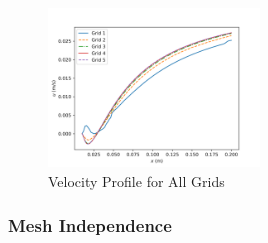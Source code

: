 \begin{figure}[H]
    \centering
    \includegraphics[width=0.5\textwidth]{Questions/Figures/recirc_combined.png}
    \caption{Velocity Profile for All Grids}
    \label{fig:velocity_profile_all_grids}
\end{figure}

\subsubsection{Mesh Independence}
